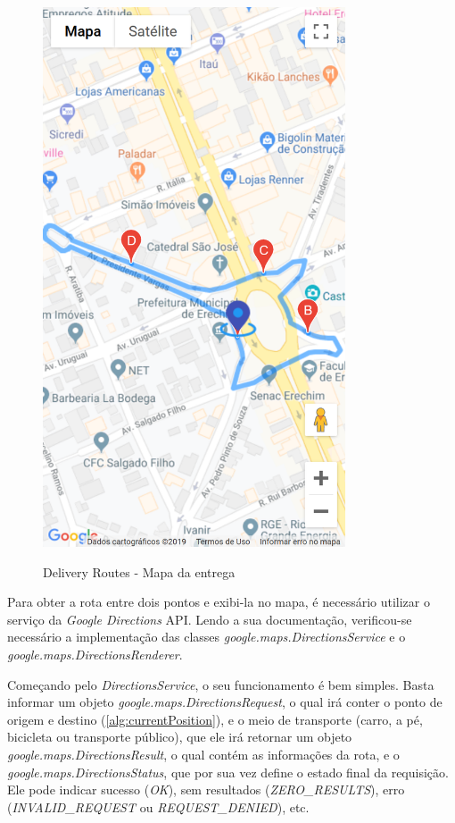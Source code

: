 \newpage
\begin{figure}[H]
    \centering
    \caption{Delivery Routes - Mapa da entrega}
    \includegraphics[width=0.8\textwidth]{./dados/figuras/fig27}
    \label{fig:drRotaEntrega}
\end{figure}

\newpage
Para obter a rota entre dois pontos e exibi-la no mapa, é necessário utilizar o serviço da \textit{Google Directions} API. Lendo a sua documentação, verificou-se necessário a implementação das classes \textit{google.maps.DirectionsService} e o \textit{google.maps.DirectionsRenderer}.

Começando pelo \textit{DirectionsService}, o seu funcionamento é bem simples. Basta informar um objeto \textit{google.maps.DirectionsRequest}, o qual irá conter o ponto de origem e destino (\autoref{alg:currentPosition}), e o meio de transporte (carro, a pé, bicicleta ou transporte público), que ele irá retornar um objeto \textit{google.maps.DirectionsResult}, o qual contém as informações da rota, e o \textit{google.maps.DirectionsStatus}, que por sua vez define o estado final da requisição. Ele pode indicar sucesso (\textit{OK}), sem resultados (\textit{ZERO\_RESULTS}), erro (\textit{INVALID\_REQUEST} ou \textit{REQUEST\_DENIED}), etc.


